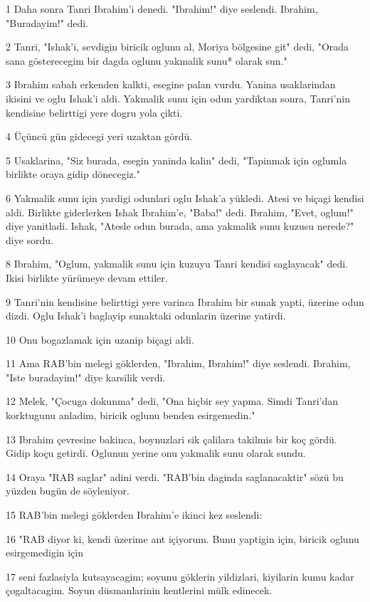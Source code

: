 \par 1 Daha sonra Tanri Ibrahim'i denedi. "Ibrahim!" diye seslendi. Ibrahim, "Buradayim!" dedi.
\par 2 Tanri, "Ishak'i, sevdigin biricik oglunu al, Moriya bölgesine git" dedi, "Orada sana gösterecegim bir dagda oglunu yakmalik sunu* olarak sun."
\par 3 Ibrahim sabah erkenden kalkti, esegine palan vurdu. Yanina usaklarindan ikisini ve oglu Ishak'i aldi. Yakmalik sunu için odun yardiktan sonra, Tanri'nin kendisine belirttigi yere dogru yola çikti.
\par 4 Üçüncü gün gidecegi yeri uzaktan gördü.
\par 5 Usaklarina, "Siz burada, esegin yaninda kalin" dedi, "Tapinmak için oglumla birlikte oraya gidip dönecegiz."
\par 6 Yakmalik sunu için yardigi odunlari oglu Ishak'a yükledi. Atesi ve biçagi kendisi aldi. Birlikte giderlerken Ishak Ibrahim'e, "Baba!" dedi. Ibrahim, "Evet, oglum!" diye yanitladi. Ishak, "Atesle odun burada, ama yakmalik sunu kuzusu nerede?" diye sordu.
\par 8 Ibrahim, "Oglum, yakmalik sunu için kuzuyu Tanri kendisi saglayacak" dedi. Ikisi birlikte yürümeye devam ettiler.
\par 9 Tanri'nin kendisine belirttigi yere varinca Ibrahim bir sunak yapti, üzerine odun dizdi. Oglu Ishak'i baglayip sunaktaki odunlarin üzerine yatirdi.
\par 10 Onu bogazlamak için uzanip biçagi aldi.
\par 11 Ama RAB'bin melegi göklerden, "Ibrahim, Ibrahim!" diye seslendi. Ibrahim, "Iste buradayim!" diye karsilik verdi.
\par 12 Melek, "Çocuga dokunma" dedi, "Ona hiçbir sey yapma. Simdi Tanri'dan korktugunu anladim, biricik oglunu benden esirgemedin."
\par 13 Ibrahim çevresine bakinca, boynuzlari sik çalilara takilmis bir koç gördü. Gidip koçu getirdi. Oglunun yerine onu yakmalik sunu olarak sundu.
\par 14 Oraya "RAB saglar" adini verdi. "RAB'bin daginda saglanacaktir" sözü bu yüzden bugün de söyleniyor.
\par 15 RAB'bin melegi göklerden Ibrahim'e ikinci kez seslendi:
\par 16 "RAB diyor ki, kendi üzerime ant içiyorum. Bunu yaptigin için, biricik oglunu esirgemedigin için
\par 17 seni fazlasiyla kutsayacagim; soyunu göklerin yildizlari, kiyilarin kumu kadar çogaltacagim. Soyun düsmanlarinin kentlerini mülk edinecek.
